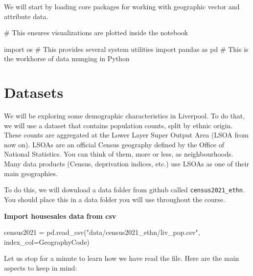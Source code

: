 \documentclass[
  letterpaper,
  DIV=11,
  numbers=noendperiod]{scrreprt}
\newenvironment{Shaded}{\begin{snugshade}}{\end{snugshade}}
\newcommand{\CommentTok}[1]{\textcolor[rgb]{0.37,0.37,0.37}{#1}}
\newcommand{\ImportTok}[1]{\textcolor[rgb]{0.00,0.46,0.62}{#1}}
\newcommand{\NormalTok}[1]{\textcolor[rgb]{0.00,0.23,0.31}{#1}}
\newcommand{\OperatorTok}[1]{\textcolor[rgb]{0.37,0.37,0.37}{#1}}
\newcommand{\StringTok}[1]{\textcolor[rgb]{0.13,0.47,0.30}{#1}}
\begin{document}

We will start by loading core packages for working with geographic
vector and attribute data.

\begin{Shaded}
\begin{Highlighting}[]
\CommentTok{\# This ensures visualizations are plotted inside the notebook}

\ImportTok{import}\NormalTok{ os              }\CommentTok{\# This provides several system utilities}
\ImportTok{import}\NormalTok{ pandas }\ImportTok{as}\NormalTok{ pd    }\CommentTok{\# This is the workhorse of data munging in Python}
\end{Highlighting}
\end{Shaded}

\section*{Datasets}\label{datasets}


We will be exploring some demographic characteristics in Liverpool. To
do that, we will use a dataset that contains population counts, split by
ethnic origin. These counts are aggregated at the Lower Layer Super
Output Area (LSOA from now on). LSOAs are an official Census geography
defined by the Office of National Statistics. You can think of them,
more or less, as neighbourhoods. Many data products (Census, deprivation
indices, etc.) use LSOAs as one of their main geographies.

To do this, we will download a data folder from github called
\texttt{census2021\_ethn}. You should place this in a data folder you
will use throughout the course.

\textbf{Import housesales data from csv}

\begin{Shaded}
\begin{Highlighting}[]
\NormalTok{census2021 }\OperatorTok{=}\NormalTok{ pd.read\_csv(}\StringTok{"data/census2021\_ethn/liv\_pop.csv"}\NormalTok{, index\_col}\OperatorTok{=}\StringTok{\textquotesingle{}GeographyCode\textquotesingle{}}\NormalTok{)}
\end{Highlighting}
\end{Shaded}

Let us stop for a minute to learn how we have read the file. Here are
the main aspects to keep in mind:
\end{document}
